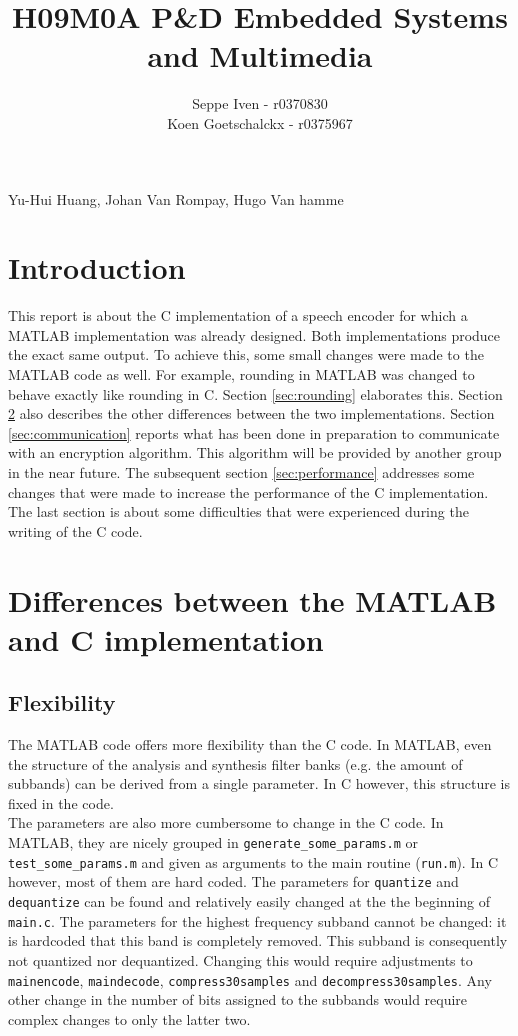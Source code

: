 \documentclass[a4paper]{article}
\title{H09M0A P\&D Embedded Systems and Multimedia}
\author{Seppe Iven - r0370830 \\ Koen Goetschalckx - r0375967}
\begin{document}
 
\maketitle
\begin{center} Yu-Hui Huang, Johan Van Rompay, Hugo Van hamme
\end{center}

\section{Introduction}
This report is about the C implementation of a speech encoder for which a MATLAB implementation was already designed. Both implementations produce the exact same output. To achieve this, some small changes were made to the MATLAB code as well. For example, rounding in MATLAB was changed to behave exactly like rounding in C. Section \ref{sec:rounding} elaborates this. Section \ref{sec:differences} also describes the other differences between the two implementations. Section \ref{sec:communication} reports what has been done in preparation to communicate with an encryption algorithm. This algorithm will be provided by another group in the near future. The subsequent section \ref{sec:performance} addresses some changes that were made to increase the performance of the C implementation. The last section is about some difficulties that were experienced during the writing of the C code.

\section{Differences between the MATLAB and C implementation}\label{sec:differences}

\subsection{Flexibility}
The MATLAB code offers more flexibility than the C code. In MATLAB, even the structure of the analysis and synthesis filter banks (e.g. the amount of subbands) can be derived from a single parameter. In C however, this structure is fixed in the code.\\

The parameters are also more cumbersome to change in the C code. In MATLAB, they are nicely grouped in \texttt{generate\_some\_params.m} or \texttt{test\_some\_params.m} and given as arguments to the main routine (\texttt{run.m}). In C however, most of them are hard coded. The parameters for \texttt{quantize} and \texttt{dequantize} can be found and relatively easily changed at the the beginning of \texttt{main.c}. The parameters for the highest frequency subband cannot be changed: it is hardcoded that this band is completely removed. This subband is consequently not quantized nor dequantized. Changing this would require adjustments to \texttt{mainencode}, \texttt{maindecode}, \texttt{compress30samples} and \texttt{decompress30samples}. Any other change in the number of bits assigned to the subbands would require complex changes to only the latter two.\\
\end{document}
